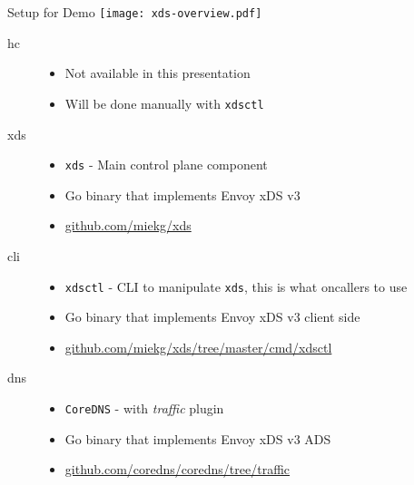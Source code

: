 \documentclass[aspectratio=169]{beamer}
\begin{document}
    \begin{frame}{Setup for Demo}
            \texttt{[image: xds-overview.pdf]}
    \end{frame}

    \begin{frame}{}
        \begin{description}
            \item[hc]
                \begin{itemize}
                    \item Not available in this presentation
                    \item Will be done manually with \texttt{xdsctl}
                \end{itemize}
            \item[xds]
                \begin{itemize}
                    \item \texttt{xds} - Main control plane component
                    \item Go binary that implements Envoy xDS v3
                    \item \url{github.com/miekg/xds}
                \end{itemize}
            \item[cli]
                \begin{itemize}
                    \item \texttt{xdsctl} - CLI to manipulate \texttt{xds}, this is what oncallers to use
                    \item Go binary that implements Envoy xDS v3 client side
                    \item \url{github.com/miekg/xds/tree/master/cmd/xdsctl}
                \end{itemize}
            \item[dns]
                \begin{itemize}
                    \item \texttt{CoreDNS} - with \emph{traffic} plugin
                    \item Go binary that implements Envoy xDS v3 ADS
                    \item \url{github.com/coredns/coredns/tree/traffic}
                \end{itemize}
        \end{description}
    \end{frame}
\end{document}
